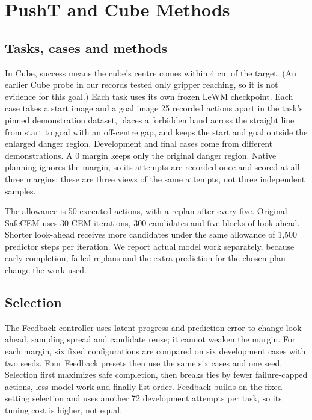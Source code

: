 \section{PushT and Cube Methods}\label{app:extension-methods}
\subsection{Tasks, cases and methods}
In Cube, success means the cube's centre comes within 4 cm of the target.
(An earlier Cube probe in our records tested only gripper reaching, so it is
not evidence for this goal.) Each task uses its own frozen LeWM checkpoint.
Each case takes a start image and a goal image 25 recorded actions apart in
the task's pinned demonstration dataset, places a forbidden band across the
straight line from start to goal with an off-centre gap, and keeps the start
and goal outside the enlarged danger region. Development and
final cases come from different demonstrations. A 0 margin keeps only the
original danger region. Native planning ignores the margin, so its attempts
are recorded once and scored at all three margins; these are three views of
the same attempts, not three independent samples.

The allowance is 50 executed actions, with a replan after every five.
Original SafeCEM uses 30 CEM iterations, 300 candidates and five blocks of
look-ahead. Shorter look-ahead receives more candidates under the same
allowance of 1,500 predictor steps per iteration. We report actual model
work separately, because early completion, failed replans and the extra
prediction for the chosen plan change the work used.

\subsection{Selection}
The Feedback controller uses latent progress and prediction error to change look-ahead, sampling
spread and candidate reuse; it cannot weaken the margin. For each margin, six
fixed configurations are compared on six development cases with two seeds.
Four Feedback presets then use the same six cases and one seed. Selection
first maximizes safe completion, then breaks ties by fewer failure-capped
actions, less model work and finally list order. Feedback builds on the
fixed-setting selection and uses another 72 development attempts per task,
so its tuning cost is higher, not equal.

